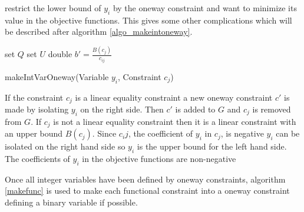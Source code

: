restrict the lower bound of $y_i$ by the oneway constraint and want to minimize its value in the objective functions. 
This gives some other complications which will be described after algorithm \ref{algo_makeintoneway}. \\ 
\IncMargin{1em}
\begin{algorithm}[H]
\algdata
{}
\BlankLine
set $Q$ 
set $U$ 
double $b' = \frac{B(c_j)}{c_{ij}}$ \;
 \;
 

 \caption{makeIntVarOneway(\textsf{Variable} $y_i$, \textsf{Constraint} $c_j$)} \label{algo_makeintoneway}
 \end{algorithm}\DecMargin{1em}
If the constraint $c_j$ is a linear equality constraint a new oneway constraint $c'$ is made by isolating $y_i$ on 
the right side. Then $c'$ is added to $G$ and $c_j$ is removed from $G$. If $c_j$ is not a linear equality constraint 
then it is a linear constraint with an upper bound $B(c_j)$. Since $c_ij$, the coefficient of $y_i$ in $c_j$, is 
negative $y_i$ can be isolated on the right hand side so $y_i$ is the upper bound for the left hand side. The 
coefficients of $y_i$ in the objective functions are non-negative   


Once all integer variables 
have been defined by oneway constraints, algorithm \ref{makefunc} is used to make each functional constraint into a 
oneway constraint defining a binary variable if possible. \\ 





